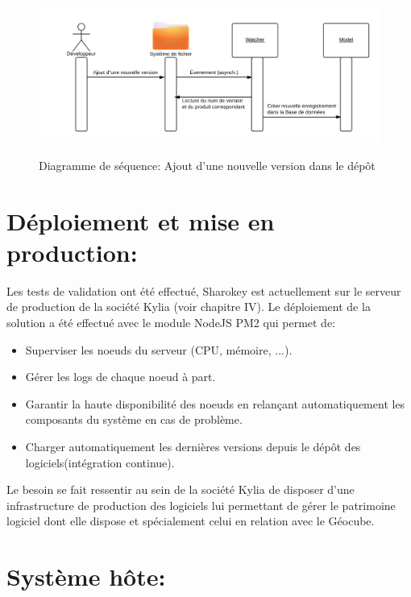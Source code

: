 \documentclass{themeensg}
\begin{document}
\begin{figure}
\centering\includegraphics[scale=0.8]{images/seq_dev.png}
\label{fig:seq_dev}
\caption{Diagramme de séquence: Ajout d'une nouvelle version dans le dépôt}
\end{figure}

\section{Déploiement et mise en production:}
Les tests de validation ont été effectué, Sharokey est actuellement sur le serveur de production de la société Kylia (voir chapitre IV). Le déploiement de la solution a été effectué avec le module NodeJS PM2 qui permet de:

\begin{itemize}
\item Superviser les noeuds du serveur (CPU, mémoire, ...).
\item Gérer les logs de chaque noeud à part.
\item Garantir la haute disponibilité des noeuds en relançant automatiquement les composants du système en cas de problème.
\item Charger automatiquement les dernières versions depuis le dépôt des logiciels(intégration continue).
\end{itemize}


Le besoin se fait ressentir au sein de la société Kylia de disposer d'une infrastructure de production des logiciels lui permettant de gérer le patrimoine logiciel dont elle dispose et spécialement celui en relation avec le Géocube.  

\section{Système hôte:}
\end{document}
